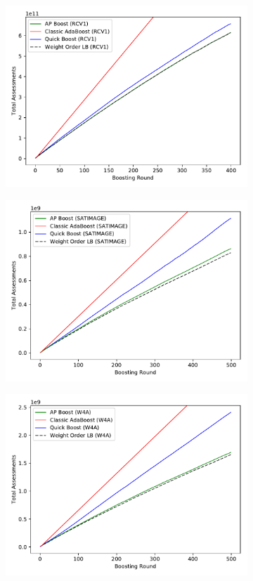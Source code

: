 \begin{figure}[ht]
\begin{subfigure}{.31\linewidth}
\includegraphics[width=\linewidth]{decisiontree/figures/result3_wolb_rcv1}
\end{subfigure}
\begin{subfigure}{.31\linewidth}
\includegraphics[width=\linewidth]{decisiontree/figures/result3_wolb_satimage}
\end{subfigure}
\begin{subfigure}{.31\linewidth}
\includegraphics[width=\linewidth]{decisiontree/figures/result3_wolb_w4a}

\end{subfigure}
\end{figure}
